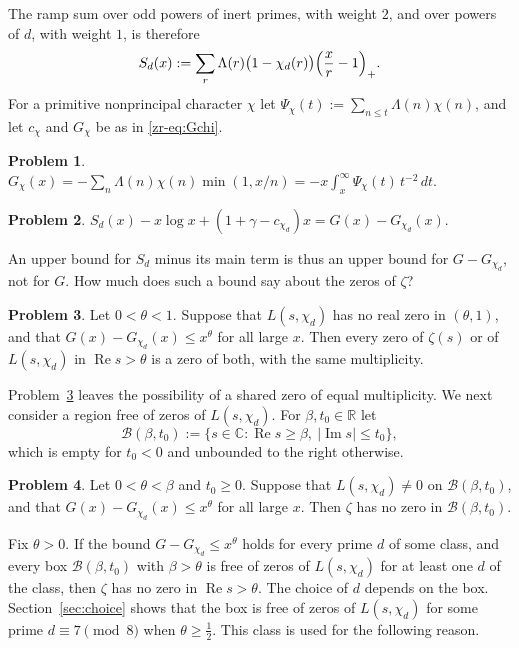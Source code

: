 \documentclass[reqno]{amsart}
\theoremstyle{definition}
\newtheorem{problem}{Problem}[section]
\theoremstyle{plain}
\theoremstyle{remark}
\newcommand{\C}{\mathbb{C}}
\newcommand{\R}{\mathbb{R}}
\renewcommand{\Re}{\operatorname{Re}}
\renewcommand{\Im}{\operatorname{Im}}
\newcommand{\Bx}{\mathcal{B}}
\begin{document}
The ramp sum over odd powers of inert primes, with weight $2$, and over powers of $d$, with weight $1$, is therefore
\[
  S_d(x) := \sum_r \Lambda(r) \bigl(1 - \chi_d(r)\bigr) \Bigl(\frac{x}{r} - 1\Bigr)_+ .
\]
For a primitive nonprincipal character $\chi$ let $\Psi_\chi(t) := \sum_{n \le t} \Lambda(n) \chi(n)$, and let $c_\chi$ and $G_\chi$ be as in \eqref{zr-eq:Gchi}.

\begin{problem}\label{pr:Gchi-min}
$G_\chi(x) = -\sum_n \Lambda(n) \chi(n) \min(1, x/n) = -x \int_x^\infty \Psi_\chi(t) \, t^{-2} \, d t$.
\end{problem}

\begin{problem}\label{pr:G-minus}
$S_d(x) - x \log x + (1 + \gamma - c_{\chi_d}) x = G(x) - G_{\chi_d}(x)$.
\end{problem}

An upper bound for $S_d$ minus its main term is thus an upper bound for $G - G_{\chi_d}$, not for $G$.  How much does such a bound say about the zeros of $\zeta$?

\begin{problem}\label{pr:fixed-d}
Let $0 < \theta < 1$.  Suppose that $L(s, \chi_d)$ has no real zero in $(\theta, 1)$, and that $G(x) - G_{\chi_d}(x) \le x^\theta$ for all large $x$.  Then every zero of $\zeta(s)$ or of $L(s, \chi_d)$ in $\Re s > \theta$ is a zero of both, with the same multiplicity.
\end{problem}

Problem~\ref{pr:fixed-d} leaves the possibility of a shared zero of equal multiplicity.  We next consider a region free of zeros of $L(s, \chi_d)$.  For $\beta, t_0 \in \R$ let
\[
  \Bx(\beta, t_0) := \{ s \in \C : \Re s \ge \beta,\ \lvert \Im s \rvert \le t_0 \},
\]
which is empty for $t_0 < 0$ and unbounded to the right otherwise.

\begin{problem}\label{pr:box-d}
Let $0 < \theta < \beta$ and $t_0 \ge 0$.  Suppose that $L(s, \chi_d) \ne 0$ on $\Bx(\beta, t_0)$, and that $G(x) - G_{\chi_d}(x) \le x^\theta$ for all large $x$.  Then $\zeta$ has no zero in $\Bx(\beta, t_0)$.
\end{problem}

Fix $\theta > 0$.  If the bound $G - G_{\chi_d} \le x^\theta$ holds for every prime $d$ of some class, and every box $\Bx(\beta, t_0)$ with $\beta > \theta$ is free of zeros of $L(s, \chi_d)$ for at least one $d$ of the class, then $\zeta$ has no zero in $\Re s > \theta$.  The choice of $d$ depends on the box.  Section~\ref{sec:choice} shows that the box is free of zeros of $L(s, \chi_d)$ for some prime $d \equiv 7 \pmod 8$ when $\theta \ge \frac12$.  This class is used for the following reason.
\end{document}
